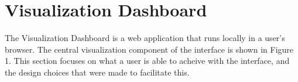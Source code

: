\documentclass{sigchi}
\begin{document}
%
%
%
%
%
%
%
%



\section{Visualization Dashboard}
The Visualization Dashboard is a web application that runs locally in a user's browser. %
%
The central visualization component of the interface is shown in Figure 1. %
%
This section focuses on what a user is able to acheive with the interface, and the design choices that were made to facilitate this. %
%
\end{document}
